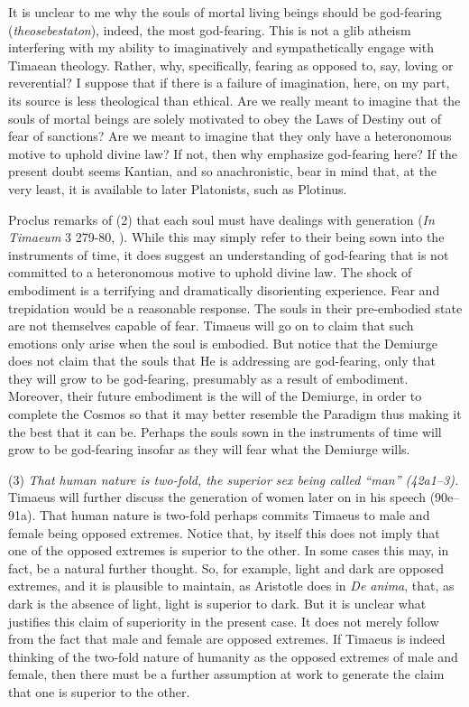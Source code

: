 It is unclear to me why the souls of mortal living beings should be god-fearing (\emph{theosebestaton}), indeed, the most god-fearing. This is not a glib atheism interfering with my ability to imaginatively and sympathetically engage with Timaean theology. Rather, why, specifically, fearing as opposed to, say, loving or reverential? I suppose that if there is a failure of imagination, here, on my part, its source is less theological than ethical. Are we really meant to imagine that the souls of mortal beings are solely motivated to obey the Laws of Destiny out of fear of sanctions? Are we meant to imagine that they only have a heteronomous motive to uphold divine law? If not, then why emphasize god-fearing here? If the present doubt seems Kantian, and so anachronistic, bear in mind that, at the very least, it is available to later Platonists, such as Plotinus.

Proclus remarks of (2) that each soul must have dealings with generation (\emph{In Timaeum} 3 279-80, \citealt{Diehl:1903re}). While this may simply refer to their being sown into the instruments of time, it does suggest an understanding of god-fearing that is not committed to a heteronomous motive to uphold divine law. The shock of embodiment is a terrifying and dramatically disorienting experience. Fear and trepidation would be a reasonable response. The souls in their pre-embodied state are not themselves capable of fear. Timaeus will go on to claim that such emotions only arise when the soul is embodied. But notice that the Demiurge does not claim that the souls that He is addressing are god-fearing, only that they will grow to be god-fearing, presumably as a result of embodiment. Moreover, their future embodiment is the will of the Demiurge, in order to complete the Cosmos so that it may better resemble the Paradigm thus making it the best that it can be. Perhaps the souls sown in the instruments of time will grow to be god-fearing insofar as they will fear what the Demiurge wills.

(3) \emph{That human nature is two-fold, the superior sex being called ``man'' (42a1--3).} Timaeus will further discuss the generation of women later on in his speech (90e--91a). That human nature is two-fold perhaps commits Timaeus to male and female being opposed extremes. Notice that, by itself this does not imply that one of the opposed extremes is superior to the other. In some cases this may, in fact, be a natural further thought. So, for example, light and dark are opposed extremes, and it is plausible to maintain, as Aristotle does in \emph{De anima}, that, as dark is the absence of light, light is superior to dark. But it is unclear what justifies this claim of superiority in the present case. It does not merely follow from the fact that male and female are opposed extremes. If Timaeus is indeed thinking of the two-fold nature of humanity as the opposed extremes of male and female, then there must be a further assumption at work to generate the claim that one is superior to the other.

